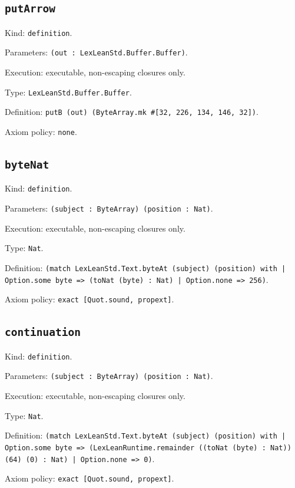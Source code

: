 \documentclass[11pt]{article}
\begin{document}
\subsection*{\texttt{putArrow}}
\noindent Kind: \texttt{definition}.\par
\noindent Parameters: \texttt{(out : LexLeanStd.Buffer.Buffer)}.\par
\noindent Execution: executable, non-escaping closures only.\par
\noindent Type: \texttt{LexLeanStd.Buffer.Buffer}.\par
\noindent Definition: \texttt{putB (out) (ByteArray.mk \#[32, 226, 134, 146, 32])}.\par
\noindent Axiom policy: \texttt{none}.\par
\subsection*{\texttt{byteNat}}
\noindent Kind: \texttt{definition}.\par
\noindent Parameters: \texttt{(subject : ByteArray) (position : Nat)}.\par
\noindent Execution: executable, non-escaping closures only.\par
\noindent Type: \texttt{Nat}.\par
\noindent Definition: \texttt{(match LexLeanStd.Text.byteAt (subject) (position) with | Option.some byte => (toNat (byte) : Nat) | Option.none => 256)}.\par
\noindent Axiom policy: \texttt{exact [Quot.sound, propext]}.\par
\subsection*{\texttt{continuation}}
\noindent Kind: \texttt{definition}.\par
\noindent Parameters: \texttt{(subject : ByteArray) (position : Nat)}.\par
\noindent Execution: executable, non-escaping closures only.\par
\noindent Type: \texttt{Nat}.\par
\noindent Definition: \texttt{(match LexLeanStd.Text.byteAt (subject) (position) with | Option.some byte => (LexLeanRuntime.remainder ((toNat (byte) : Nat)) (64) (0) : Nat) | Option.none => 0)}.\par
\noindent Axiom policy: \texttt{exact [Quot.sound, propext]}.\par
\end{document}
